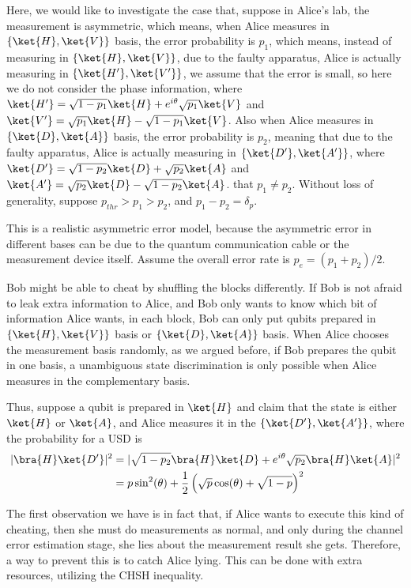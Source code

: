     Here, we would like to investigate the case that, suppose in Alice's lab, the measurement is asymmetric, which means, when Alice measures in $\{\ket{H}, \ket{V}\}$ basis, the error probability is $p_1$, which means, instead of measuring in $\{\ket{H}, \ket{V}\}$, due to the faulty apparatus, Alice is actually measuring in $\{\ket{H'}, \ket{V'}\}$, we assume that the error is small, so here we do not consider the phase information, where $\ket{H'}=\sqrt{1-p_1}\ket{H}+e^{i\theta}\sqrt{p_1}\ket{V}$ and $\ket{V'}=\sqrt{p_1}\ket{H}-\sqrt{1-p_1}\ket{V}$. Also when Alice measures in $\{\ket{D}, \ket{A}\}$ basis, the error probability is $p_2$, meaning that due to the faulty apparatus, Alice is actually measuring in $\{\ket{D'}, \ket{A'}\}$, where $\ket{D'}=\sqrt{1-p_2}\ket{D}+\sqrt{p_2}\ket{A}$ and $\ket{A'}=\sqrt{p_2}\ket{D}-\sqrt{1-p_2}\ket{A}$. that $p_1\ne p_2$. Without loss of generality, suppose $p_{thr}>p_1>p_2$, and $p_1-p_2=\delta_p$.

This is a realistic asymmetric error model, because the asymmetric error in different bases can be due to the quantum communication cable or the measurement device itself. Assume the overall error rate is $p_e=(p_1+p_2)/2$.

Bob might be able to cheat by shuffling the blocks differently. If Bob is not afraid to leak extra information to Alice, and Bob only wants to know which bit of information Alice wants, in each block, Bob can only put qubits prepared in $\{\ket{H}, \ket{V}\}$ basis or $\{\ket{D}, \ket{A}\}$ basis. When Alice chooses the measurement basis randomly, as we argued before, if Bob prepares the qubit in one basis, a unambiguous state discrimination is only possible when Alice measures in the complementary basis.

Thus, suppose a qubit is prepared in $\ket{H}$ and claim that the state is either $\ket{H}$ or $\ket{A}$, and Alice measures it in the $\{\ket{D'}, \ket{A'}\}$, where the probability for a USD is 
\begin{equation}
\begin{split}
    |\bra{H}\ket{D'}|^2&=\lvert\sqrt{1-p_2}\bra{H}\ket{D}+e^{i\theta}\sqrt{p_2}\bra{H}\ket{A}\rvert^2\\
    &=p \sin ^2(\theta)+\frac{1}{2} \left(\sqrt{p} \cos (\theta)+\sqrt{1-p}\right)^2\\
\end{split}
\end{equation}


The first observation we have is in fact that, if Alice wants to execute this kind of cheating, then she must do measurements as normal, and only during the channel error estimation stage, she lies about the measurement result she gets. Therefore, a way to prevent this is to catch Alice lying. This can be done with extra resources, utilizing the CHSH inequality.

